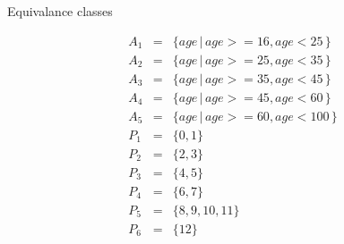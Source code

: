\documentclass[12pt,a4paper]{report}
\begin{document}
{\LARGE Equivalance classes}


\begin{eqnarray*}
    A_1 &=& \{ age\, |\, age >= 16, age < 25\, \} \\
    A_2 &=& \{ age\, |\, age >= 25, age < 35\, \} \\
    A_3 &=& \{ age\, |\, age >= 35, age < 45\, \} \\
    A_4 &=& \{ age\, |\, age >= 45, age < 60\, \} \\
    A_5 &=& \{ age\, |\, age >= 60, age < 100\, \} \\
    P_1 &=& \{ 0, 1 \} \\
    P_2 &=& \{ 2, 3 \} \\
    P_3 &=& \{ 4, 5 \} \\
    P_4 &=& \{ 6, 7 \} \\
    P_5 &=& \{ 8, 9, 10, 11 \} \\
    P_6 &=& \{ 12 \} \\
\end{eqnarray*}

\newpage
\end{document}
